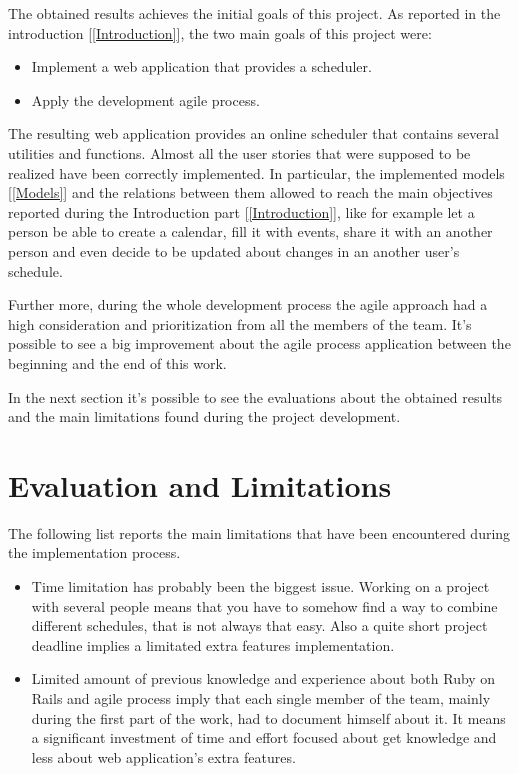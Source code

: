 The obtained results achieves the initial goals of this project.
As reported in the introduction [\ref{Introduction}], the two main goals of this project were:\vspace{-2mm}
\begin{itemize}
 \item Implement a web application that provides a scheduler.
 \item Apply the development agile process.
\end{itemize}

The resulting web application provides an online scheduler that contains several utilities and functions. Almost all the user stories that were supposed to be realized have been correctly implemented. In particular, the implemented models [\ref{Models}] and the relations between them allowed to reach the main objectives reported during the Introduction part [\ref{Introduction}], like for example let a person be able to create a calendar, fill it with events, share it with an another person and even decide to be updated about changes in an another user's schedule.

Further more, during the whole development process the agile approach had a high consideration and prioritization from all the members of the team. It's possible to see a big improvement about the agile process application between the beginning and the end of this work.

In the next section it's possible to see the evaluations about the obtained results and the main limitations found during the project development.
\newpage

\section{Evaluation and Limitations}
\vspace{-5mm}
\label{Evaluation}
The following list reports the main limitations that have been encountered during the implementation process.
\vspace{-5mm}
\begin{itemize}
\item Time limitation has probably been the biggest issue. Working on a project with several people means that you have to somehow find a way to combine different schedules, that is not always that easy. Also a quite short project deadline implies a limitated extra features implementation.
\item Limited amount of previous knowledge and experience about both Ruby on Rails and agile process imply that each single member of the team, mainly during the first part of the work, had to document himself about it. It means a significant investment of time and effort focused about get knowledge and less about web application's extra features. 
\end{itemize}

